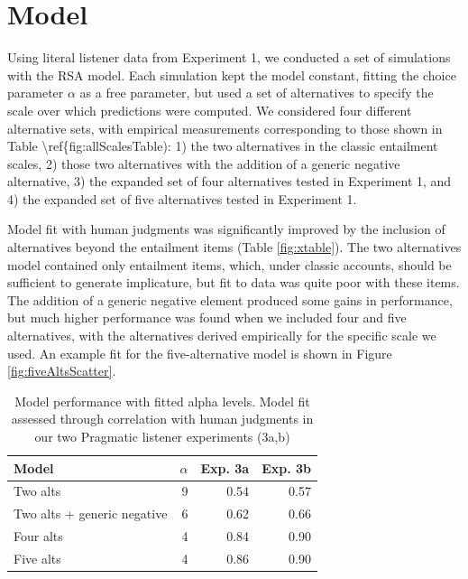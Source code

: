 \documentclass[10pt, letterpaper]{article}
\begin{document}
\section{Model}\label{model}

Using literal listener data from Experiment 1, we conducted a set of
simulations with the RSA model. Each simulation kept the model constant,
fitting the choice parameter \(\alpha\) as a free parameter, but used a
set of alternatives to specify the scale over which predictions were
computed. We considered four different alternative sets, with empirical
measurements corresponding to those shown in Table
\textbackslash{}ref\{fig:allScalesTable): 1) the two alternatives in the
classic entailment scales, 2) those two alternatives with the addition
of a generic negative alternative, 3) the expanded set of four
alternatives tested in Experiment 1, and 4) the expanded set of five
alternatives tested in Experiment 1.

Model fit with human judgments was significantly improved by the
inclusion of alternatives beyond the entailment items (Table
\ref{fig:xtable}). The two alternatives model contained only entailment
items, which, under classic accounts, should be sufficient to generate
implicature, but fit to data was quite poor with these items. The
addition of a generic negative element produced some gains in
performance, but much higher performance was found when we included four
and five alternatives, with the alternatives derived empirically for the
specific scale we used. An example fit for the five-alternative model is
shown in Figure \ref{fig:fiveAltsScatter}.

\begin{table}[ht]
\centering
\begin{tabular}{lrrr}
  \hline
Model & $\alpha$ & Exp. 3a & Exp. 3b \\ 
  \hline
Two alts &   9 & 0.54 & 0.57 \\ 
  Two alts + generic negative  &   6 & 0.62 & 0.66 \\ 
  Four alts &   4 & 0.84 & 0.90 \\ 
  Five alts &   4 & 0.86 & 0.90 \\ 
   \hline
\end{tabular}
\caption{Model performance with fitted alpha levels. Model fit assessed through correlation with human judgments in our two Pragmatic listener experiments (3a,b)} 
\end{table}
\end{document}
